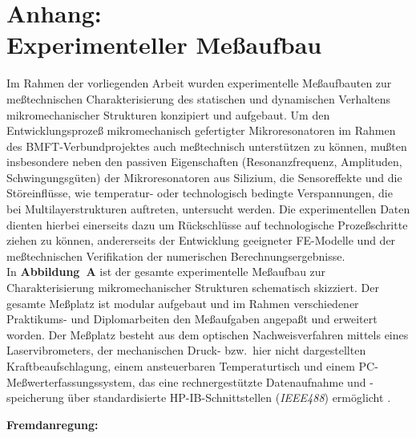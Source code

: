 
\chapter*{Anhang:\\ Experimenteller Meßaufbau}
\label{anhang}

Im Rahmen der vorliegenden Arbeit wurden experimentelle Meßaufbauten zur
meßtechnischen Charakterisierung des statischen und dynamischen Verhaltens
mikromechanischer Strukturen konzipiert und aufgebaut. Um den
Entwicklungsprozeß mikromechanisch gefertigter Mikroresonatoren im Rahmen
des BMFT-Verbundprojektes auch meßtechnisch unterstützen zu können, mußten
insbesondere neben den passiven Eigenschaften (Resonanzfrequenz, Amplituden,
Schwingungsgüten) der Mikroresonatoren aus Silizium, die Sensoreffekte
und die Störeinflüsse, wie temperatur- oder technologisch bedingte
Verspannungen, die bei Multilayerstrukturen auftreten, untersucht werden.
Die experimentellen Daten dienten hierbei einerseits dazu um Rückschlüsse auf
technologische Prozeßschritte ziehen zu können, andererseits der
Entwicklung geeigneter FE-Modelle und der meßtechnischen Verifikation der
numerischen Berechnungsergebnisse.\\

In {\bf Abbildung~A} ist der gesamte experimentelle Meßaufbau zur
Charakterisierung mikromechanischer Strukturen schematisch skizziert.
Der gesamte Meßplatz ist modular aufgebaut und im Rahmen verschiedener
Praktikums- und Diplomarbeiten den Meßaufgaben angepaßt und erweitert
worden. Der Meßplatz besteht aus dem optischen Nachweisverfahren mittels
eines Laservibrometers, der mechanischen Druck- bzw.\ hier nicht
dargestellten Kraftbeaufschlagung, einem ansteuerbaren
Temperaturtisch und einem PC-Meßwerterfassungssystem, das eine
rechnergestützte Datenaufnahme und -speicherung über standardisierte
{\sf HP-IB}-Schnittstellen ({\em IEEE488}) ermöglicht \cite{Mue92}.


{\bf Fremdanregung:}

